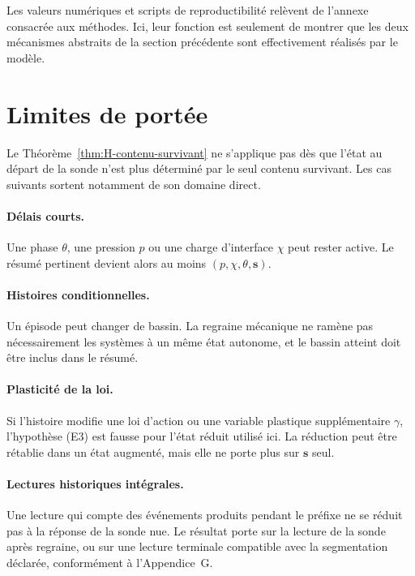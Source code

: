 Les valeurs numériques et scripts de reproductibilité relèvent de
l'annexe consacrée aux méthodes. Ici, leur fonction est seulement de
montrer que les deux mécanismes abstraits de la section précédente sont
effectivement réalisés par le modèle.

\section{Limites de portée}
\label{annexe-H-limites}

Le Théorème~\ref{thm:H-contenu-survivant} ne s'applique pas dès que l'état au départ de la sonde
n'est plus déterminé par le seul contenu survivant. Les cas suivants
sortent notamment de son domaine direct.

\paragraph{Délais courts.}
Une phase $\theta$, une pression $p$ ou une charge d'interface $\chi$
peut rester active. Le résumé pertinent devient alors au moins
$(p,\chi,\theta,\mathbf s)$.

\paragraph{Histoires conditionnelles.}
Un épisode peut changer de bassin. La regraine mécanique ne ramène pas
nécessairement les systèmes à un même état autonome, et le bassin atteint
doit être inclus dans le résumé.

\paragraph{Plasticité de la loi.}
Si l'histoire modifie une loi d'action ou une variable plastique
supplémentaire $\gamma$, l'hypothèse (E3) est fausse pour l'état réduit
utilisé ici. La réduction peut être rétablie dans un état augmenté, mais
elle ne porte plus sur $\mathbf s$ seul.

\paragraph{Lectures historiques intégrales.}
Une lecture qui compte des événements produits pendant le préfixe ne se
réduit pas à la réponse de la sonde nue. Le résultat porte sur la lecture
de la sonde après regraine, ou sur une lecture terminale compatible avec
la segmentation déclarée, conformément à l'Appendice~G.

